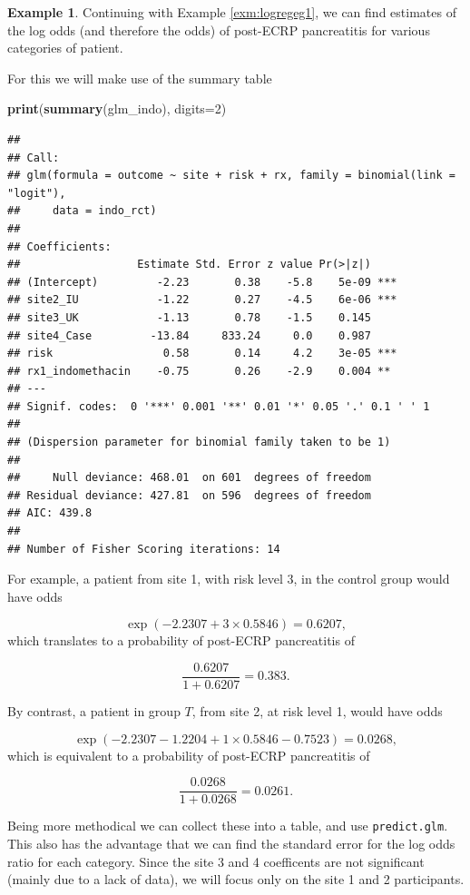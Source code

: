 \documentclass[
  openany]{book}
\newenvironment{Shaded}{\begin{snugshade}}{\end{snugshade}}
\newcommand{\AttributeTok}[1]{\textcolor[rgb]{0.13,0.29,0.53}{#1}}
\newcommand{\DecValTok}[1]{\textcolor[rgb]{0.00,0.00,0.81}{#1}}
\newcommand{\FunctionTok}[1]{\textcolor[rgb]{0.13,0.29,0.53}{\textbf{#1}}}
\newcommand{\NormalTok}[1]{#1}
\theoremstyle{definition}
\theoremstyle{definition}
\newtheorem{example}{Example}[chapter]
\theoremstyle{definition}
\theoremstyle{definition}
\theoremstyle{remark}
\begin{document}
\begin{example}

Continuing with Example \ref{exm:logregeg1}, we can find estimates of the log odds (and therefore the odds) of post-ECRP pancreatitis for various categories of patient.

For this we will make use of the summary table

\begin{Shaded}
\begin{Highlighting}[]
\FunctionTok{print}\NormalTok{(}\FunctionTok{summary}\NormalTok{(glm\_indo), }\AttributeTok{digits=}\DecValTok{2}\NormalTok{)}
\end{Highlighting}
\end{Shaded}

\begin{verbatim}
## 
## Call:
## glm(formula = outcome ~ site + risk + rx, family = binomial(link = "logit"), 
##     data = indo_rct)
## 
## Coefficients:
##                  Estimate Std. Error z value Pr(>|z|)    
## (Intercept)         -2.23       0.38    -5.8    5e-09 ***
## site2_IU            -1.22       0.27    -4.5    6e-06 ***
## site3_UK            -1.13       0.78    -1.5    0.145    
## site4_Case         -13.84     833.24     0.0    0.987    
## risk                 0.58       0.14     4.2    3e-05 ***
## rx1_indomethacin    -0.75       0.26    -2.9    0.004 ** 
## ---
## Signif. codes:  0 '***' 0.001 '**' 0.01 '*' 0.05 '.' 0.1 ' ' 1
## 
## (Dispersion parameter for binomial family taken to be 1)
## 
##     Null deviance: 468.01  on 601  degrees of freedom
## Residual deviance: 427.81  on 596  degrees of freedom
## AIC: 439.8
## 
## Number of Fisher Scoring iterations: 14
\end{verbatim}

For example, a patient from site 1, with risk level 3, in the control group would have odds

\[\exp\left(-2.2307 + 3\times 0.5846\right) = 0.6207, \]
which translates to a probability of post-ECRP pancreatitis of

\[\frac{0.6207}{1+0.6207} = 0.383. \]

By contrast, a patient in group \(T\), from site 2, at risk level 1, would have odds

\[\exp\left(-2.2307 - 1.2204 + 1\times 0.5846 - 0.7523\right) = 0.0268, \]
which is equivalent to a probability of post-ECRP pancreatitis of

\[\frac{0.0268}{1+0.0268} = 0.0261.\]

Being more methodical we can collect these into a table, and use \texttt{predict.glm}. This also has the advantage that we can find the standard error for the log odds ratio for each category. Since the site 3 and 4 coefficents are not significant (mainly due to a lack of data), we will focus only on the site 1 and 2 participants.


\end{example}
\end{document}
